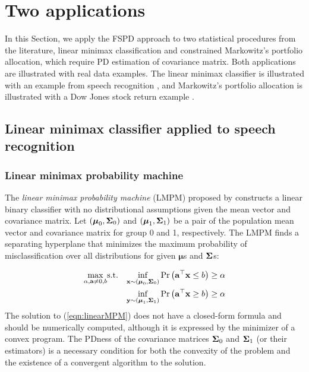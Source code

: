 \documentclass[times,sort&compress,3p]{elsarticle}
\newcommand{\NN}{\nonumber}
\begin{document}
\section{Two applications}\label{sec:plug-in}

In this Section, we apply the FSPD approach to two statistical procedures from the literature,
linear minimax classification and constrained Markowitz's portfolio allocation, which require PD estimation
of covariance matrix. Both applications are illustrated with real data examples.
The linear minimax classifier is illustrated with an example from speech recognition \citep{Tsanas2014}, and
Markowitz's portfolio allocation is illustrated with a Dow Jones stock return example \citep{Won2013}.

\subsection{Linear minimax classifier applied to speech recognition}

\subsubsection{Linear minimax probability machine}

The \emph{linear minimax probability machine} (LMPM) proposed by \citet{Lanckriet2002} constructs a
linear binary classifier with no distributional assumptions given the mean vector and covariance matrix.
Let $({\boldsymbol \mu}_0, {\bf \Sigma}_0)$ and $({\boldsymbol \mu}_1, {\bf \Sigma}_1)$ be
a pair of the population mean vector and
 covariance matrix for group 0 and 1, respectively.
The LMPM finds a separating hyperplane that minimizes the maximum probability of misclassification over all distributions
for given ${\boldsymbol \mu}$s and ${\bf \Sigma}$s:

\begin{eqnarray}
\max_{\alpha, {\bf a} \neq 0, b} &\mbox{s.t.}&
	\inf_{ {\bf x} \sim ({\boldsymbol \mu}_0, {\bf \Sigma}_0) }
	\Pr\left( {\bf a}^{\top}{\bf x} \leq b \right) \geq \alpha \label{eqn:linearMPM} \\
&&
	\inf_{ {\bf y} \sim ({\boldsymbol \mu}_1, {\bf \Sigma}_1) }
	\Pr\left( {\bf a}^{\top}{\bf x} \geq b \right) \geq \alpha \NN
\end{eqnarray}
The solution to (\ref{eqn:linearMPM}) does not have a closed-form formula  and should be numerically
computed, although it is expressed by the minimizer of a convex program. 
The PDness of the covariance matrices ${\bf \Sigma}_0$ and ${\bf \Sigma}_1$ (or their estimators)
is a necessary condition for both the convexity of the problem and the existence of
a convergent algorithm to the solution.
\end{document}
